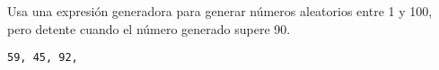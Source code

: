\begin{exercise} Usa una expresión generadora para generar números aleatorios entre 1 y 100, pero detente cuando el número generado supere 90.
\begin{Shaded}
\begin{Highlighting}[]
\OperatorTok{=} \NormalTok{(}\NormalTok{, }\NormalTok{), }\NormalTok{))}
    \OperatorTok{=}\NormalTok{)}
    \OperatorTok{\textgreater{}} \NormalTok{:}
          
\end{Highlighting}
\end{Shaded}

\begin{verbatim}
59, 45, 92, 
\end{verbatim}
\end{exercise}
